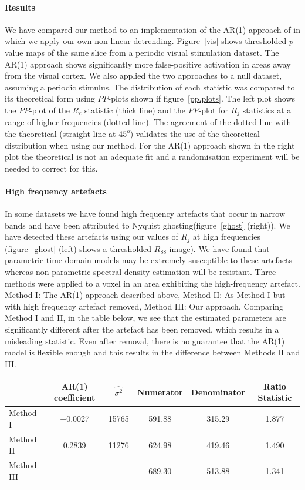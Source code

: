 \documentclass[a0,portrait]{a0poster}
\begin{document}
\begin{center}
{\paragraph{Results}
We have compared our method to an implementation of the AR(1) approach of \cite{Bullmore:1996} in which we apply our own non-linear detrending. Figure~\ref{vis} shows thresholded $p$-value maps of the same slice from a periodic visual stimulation dataset. The AR(1) approach shows significantly more false-positive activation in areas away from the visual cortex. We also applied the two approaches to a null dataset, assuming a periodic stimulus. The distribution of each statistic was compared to its theoretical form using $PP$-plots shown if figure~\ref{pp.plots}. The left plot shows the $PP$-plot of the $R_c$ statistic (thick line) and the $PP$-plot for $R_j$ statistics at a range of higher frequencies (dotted line). The agreement of the dotted line with the theoretical (straight line at $45^o$) validates the use of the theoretical distribution when using our method. For the AR(1) approach shown in the right plot the theoretical is not an adequate fit and a randomisation experiment will be needed to correct for this. 
\paragraph{High frequency artefacts}
In some datasets we have found high frequency artefacts that occur in narrow bands and have been attributed to Nyquist ghosting(figure~\ref{ghost} (right)). We have detected these artefacts using our values of $R_j$ at high frequencies (figure~\ref{ghost} (left) shows a thresholded $R_{88}$ image).
We have found that parametric-time domain models may be extremely susceptible to these artefacts whereas non-parametric spectral density estimation will be resistant. Three methods were applied to a voxel in an area exhibiting the high-frequency artefact. Method I: The AR(1) approach described above, Method II: As Method I but with high frequency artefact removed, Method III: Our approach. Comparing Method I and II, in the table below, we see that the estimated parameters are significantly different after the artefact has been removed, which results in a misleading statistic. Even after removal, there is no guarantee that the AR(1) model is flexible enough and this results in the difference between Methods II and III.
\begin{center}
\small
\begin{tabular}{|l||c|c|c|c|c|}
\hline 
& AR(1) coefficient & $\widehat{\sigma^2}$ & Numerator & Denominator & Ratio Statistic\\
\hline \hline
Method I & $-$0.0027 & 15765 & 591.88 & 315.29 & 1.877\\
\hline
Method II & 0.2839 & 11276 & 624.98 & 419.46 & 1.490\\
\hline 
Method III& --- & --- & 689.30 & 513.88 & 1.341\\
\hline 
\end{tabular}
\end{center}
}
\end{center}
\end{document}
